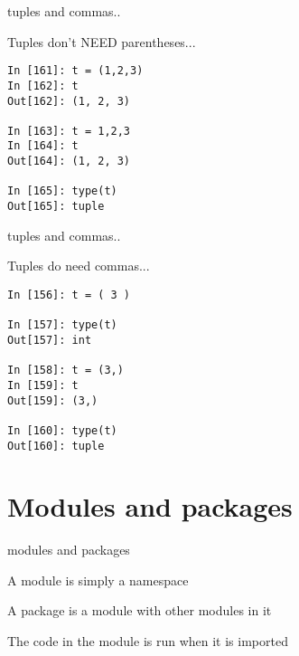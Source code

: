 \documentclass{beamer}
\begin{document}
\begin{frame}[fragile]{tuples and commas..}

{\Large  Tuples don't NEED parentheses... }

\begin{verbatim}
In [161]: t = (1,2,3)
In [162]: t
Out[162]: (1, 2, 3)

In [163]: t = 1,2,3
In [164]: t
Out[164]: (1, 2, 3)

In [165]: type(t)
Out[165]: tuple
\end{verbatim}

\end{frame}

\begin{frame}[fragile]{tuples and commas..}

{\Large  Tuples do need commas... }

\begin{verbatim}
In [156]: t = ( 3 )

In [157]: type(t)
Out[157]: int

In [158]: t = (3,)
In [159]: t
Out[159]: (3,)

In [160]: type(t)
Out[160]: tuple
\end{verbatim}

\end{frame}

%
%


\section{Modules and packages}

\begin{frame}{modules and packages}

{\Large A module is simply a namespace}

\vfill
{\Large A package is a module with other modules in it}

\vfill
{\Large The code in the module is run when it is imported}

\end{frame}
\end{document}
